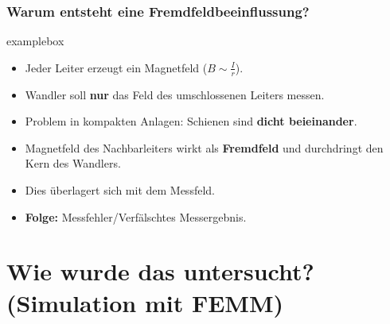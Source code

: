 \begin{frame}
    \frametitle{Warum entsteht eine Fremdfeldbeeinflussung?}
    \begin{beamercolorbox}[wd=1\textwidth, sep=1ex, rounded=true, shadow=true]{examplebox}
        \begin{itemize}
            \item Jeder Leiter erzeugt ein Magnetfeld ($B \sim \frac{I}{r}$).
            \item Wandler soll \textbf{nur} das Feld des umschlossenen Leiters messen.
            \item Problem in kompakten Anlagen: Schienen sind \textbf{dicht beieinander}.
            \item Magnetfeld des Nachbarleiters wirkt als \textbf{Fremdfeld} und durchdringt den Kern des Wandlers.
            \item Dies überlagert sich mit dem Messfeld.
            \item \textbf{Folge:} Messfehler/Verfälschtes Messergebnis.
        \end{itemize}
    \end{beamercolorbox}
\end{frame}







\section*{Wie wurde das untersucht? (Simulation mit FEMM)}

